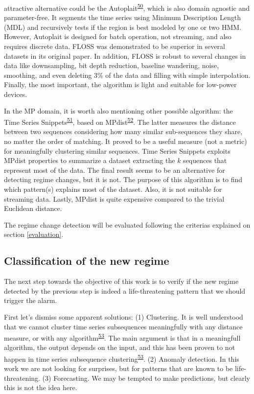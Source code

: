 \documentclass[12pt,twoside]{fmupthesis}
\begin{document}
attractive alternative could be the Autoplait\textsuperscript{\protect\hyperlink{ref-Matsubara2014}{50}}, which is also domain agnostic and
parameter-free. It segments the time series using Minimum Description Length (MDL) and recursively
tests if the region is best modeled by one or two HMM. However, Autoplait is designed for batch
operation, not streaming, and also requires discrete data. FLOSS was demonstrated to be superior in
several datasets in its original paper. In addition, FLOSS is robust to several changes in data like
downsampling, bit depth reduction, baseline wandering, noise, smoothing, and even deleting 3\% of the
data and filling with simple interpolation. Finally, the most important, the algorithm is light and
suitable for low-power devices.

In the MP domain, it is worth also mentioning other possible algorithm: the Time Series Snippets\textsuperscript{\protect\hyperlink{ref-Imani2018}{51}}, based on MPdist\textsuperscript{\protect\hyperlink{ref-gharghabi2018b}{52}}. The latter measures the distance between two
sequences considering how many similar sub-sequences they share, no matter the order of matching. It
proved to be a useful measure (not a metric) for meaningfully clustering similar sequences. Time
Series Snippets exploits MPdist properties to summarize a dataset extracting the \(k\) sequences that
represent most of the data. The final result seems to be an alternative for detecting regime
changes, but it is not. The purpose of this algorithm is to find which pattern(s) explains most of
the dataset. Also, it is not suitable for streaming data. Lastly, MPdist is quite expensive compared
to the trivial Euclidean distance.

The regime change detection will be evaluated following the criterias explained on section
\ref{evaluation}.

\hypertarget{classregime}{%
\subsection{Classification of the new regime}\label{classregime}}

The next step towards the objective of this work is to verify if the new regime detected by the
previous step is indeed a life-threatening pattern that we should trigger the alarm.

First let's dismiss some apparent solutions: (1) Clustering. It is well understood that we cannot
cluster time series subsequences meaningfully with any distance measure, or with any algorithm\textsuperscript{\protect\hyperlink{ref-Keogh2005}{53}}. The main argument is that in a meaningfull algorithm, the output depends on the input,
and this has been proven to not happen in time series subsequence clustering\textsuperscript{\protect\hyperlink{ref-Keogh2005}{53}}. (2)
Anomaly detection. In this work we are not looking for surprises, but for patterns that are known to
be life-threatening. (3) Forecasting. We may be tempted to make predictions, but clearly this is not
the idea here.
\end{document}

